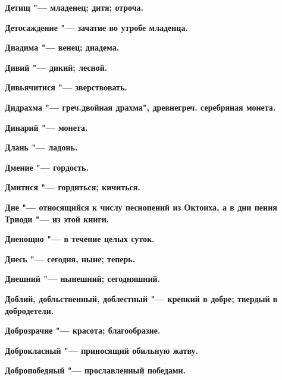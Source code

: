 \bfseries Детищ \normalfont{} "--- младенец; дитя; отроча. 




\bfseries Детосаждение \normalfont{} "--- зачатие во утробе младенца. 




\bfseries Диадима \normalfont{} "--- венец; диадема. 




\bfseries Дивий \normalfont{} "--- дикий; лесной. 




\bfseries Дивьячитися \normalfont{} "--- зверствовать. 




\bfseries Дидрахма \normalfont{} "--- греч.двойная драхма", древнегреч. серебряная монета. 




\bfseries Динарий \normalfont{} "--- монета. 




\bfseries Длань \normalfont{} "--- ладонь. 




\bfseries Дмение \normalfont{} "--- гордость. 




\bfseries Дмитися \normalfont{} "--- гордиться; кичиться. 




\bfseries Дне \normalfont{} "--- относящийся к числу песнопений из Октоиха, а в дни пения Триоди "--- из этой книги. 




\bfseries Дненощно \normalfont{} "--- в течение целых суток. 




\bfseries Днесь \normalfont{} "--- сегодня, ныне; теперь. 




\bfseries Днешний \normalfont{} "--- нынешний; сегодняшний. 




\bfseries Доблий, добльственный, доблестный \normalfont{} "--- крепкий в добре; твердый в добродетели. 




\bfseries Доброзрачие \normalfont{} "--- красота; благообразие. 




\bfseries Доброкласный \normalfont{} "--- приносящий обильную жатву. 




\bfseries Добропобедный \normalfont{} "--- прославленный победами. 




